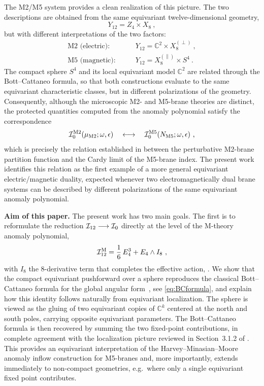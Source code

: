 \documentclass[11pt,a4paper]{article}
\def\cI{{\cal I}}
\theoremstyle{definition}
\theoremstyle{identity}
\theoremstyle{remark}
\newcommand{\be}{\begin{equation}}
\newcommand{\ee}{\end{equation}}
\newcommand{\BC}{\mathbb{C}}
\begin{document}
The M2/M5 system provides a clean realization of this picture. The two descriptions are
obtained from the same equivariant twelve-dimensional geometry,
\be
Y_{12}=Z_4\times X_8\ ,
\ee
but with different interpretations of the two factors:
\begin{equation}
\begin{aligned}
\text{M2 (electric):}\qquad
&Y_{12}=\BC^2\times X_8^{(\perp)}\ ,\\
\text{M5 (magnetic):}\qquad
&Y_{12}=X_8^{(\parallel)}\times S^4\ .
\end{aligned}
\end{equation}
The compact sphere $S^4$ and its local equivariant model $\BC^2$ are related through the
Bott--Cattaneo formula, so that both constructions evaluate to the same equivariant
characteristic classes, but in different polarizations of the geometry. Consequently,
although the microscopic M2- and M5-brane theories are distinct, the protected quantities
computed from the anomaly polynomial satisfy the correspondence
\begin{equation}
\label{eq:mainduality}
\cI_0^{\rm M2}(\mu_{\rm M2};\omega,\epsilon)
\quad\longleftrightarrow\quad
\cI_0^{\rm M5}(N_{\rm M5};\omega,\epsilon)\ ,
\end{equation}
which is precisely the relation established in \cite{Hristov:2026tde} between the
perturbative M2-brane partition function and the Cardy limit of the M5-brane index. The
present work identifies this relation as the first example of a more general equivariant
electric/magnetic duality, expected whenever two electromagnetically dual brane systems can
be described by different polarizations of the same equivariant anomaly polynomial.



\medskip
\noindent\textbf{Aim of this paper.}
The present work has two main goals. The first is to reformulate the reduction
$\cI_{12}\longrightarrow \cI_0$ directly at the level of the M-theory anomaly polynomial,
\be
\label{eq:Manom}
\cI_{12}^{\rm M}
=
\frac16\,E_4^3
+
E_4\wedge I_8\ ,
\ee
with $I_8$ the 8-derivative term that completes the effective action, \cite{Witten:1996hc,Freed:1998tg,Harvey:1998bx}.
We show that the compact equivariant pushforward over a sphere reproduces the classical
Bott--Cattaneo formula for the global angular form~\cite{1997dg.ga}, see \eqref{eq:BCformula}, and explain how this identity follows naturally from equivariant localization.
The sphere is viewed as the gluing of two equivariant copies of $\BC^k$ centered at the
north and south poles, carrying opposite equivariant parameters. The Bott--Cattaneo
formula is then recovered by summing the two fixed-point contributions, in complete
agreement with the localization picture reviewed in Section~3.1.2 of
\cite{Hosseini:2020vgl}. This provides an equivariant interpretation of the
Harvey--Minasian--Moore anomaly inflow construction for M5-branes and, more importantly,
extends immediately to non-compact geometries, e.g.\ where only a single equivariant fixed point
contributes.
\end{document}
